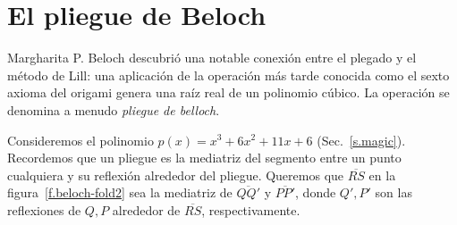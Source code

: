 \section{El pliegue de Beloch}\label{s.beloch-fold}

Margharita P. Beloch descubrió una notable conexión entre el plegado y el método de Lill: una aplicación de la operación más tarde conocida como el sexto axioma del origami genera una raíz real de un polinomio cúbico. La operación se denomina a menudo \emph{pliegue de belloch}.

Consideremos el polinomio $p(x)=x^3+6x^2+11x+6$ (Sec.~\ref{s.magic}). Recordemos que un pliegue es la mediatriz del segmento entre un punto cualquiera y su reflexión alrededor del pliegue. Queremos que $\overline{RS}$ en la figura~\ref{f.beloch-fold2} sea la mediatriz de $\overline{QQ'}$ y $\overline{PP'}$, donde $Q',P'$ son las reflexiones de $Q,P$ alrededor de $\overline{RS}$, respectivamente.

